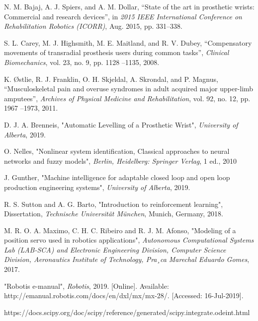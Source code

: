 \documentclass[letterpaper,12pt]{article}
\begin{document}
\begin{thebibliography}{99}
N. M. Bajaj, A. J. Spiers, and A. M. Dollar, “State of the art in prosthetic wrists: Commercial and research devices”, in \textit{2015 IEEE International Conference on Rehabilitation Robotics
(ICORR)}, Aug. 2015, pp. 331–338.

S. L. Carey, M. J. Highsmith, M. E. Maitland, and R. V. Dubey, “Compensatory movements
of transradial prosthesis users during common tasks”, \textit{Clinical Biomechanics}, vol. 23, no. 9,
pp. 1128 –1135, 2008.

K. Østlie, R. J. Franklin, O. H. Skjeldal, A. Skrondal, and P. Magnus, “Musculoskeletal pain
and overuse syndromes in adult acquired major upper-limb amputees”, \textit{Archives of Physical
Medicine and Rehabilitation}, vol. 92, no. 12, pp. 1967 –1973, 2011.

D. J. A. Brenneis, "Automatic Levelling of a Prosthetic Wrist", \textit{University of Alberta}, 2019.

O. Nelles, "Nonlinear system identification, Classical approaches to neural networks and fuzzy models", \textit{Berlin, Heidelberg: Springer Verlag}, 1 ed., 2010

J. Gunther, "Machine intelligence for adaptable closed loop and open loop production engineering systems", \textit{University of Alberta}, 2019.

R. S. Sutton and A. G. Barto, "Introduction to reinforcement learning", Dissertation, \textit{Technische Universität München}, Munich, Germany, 2018.

M. R. O. A. Maximo, C. H. C. Ribeiro and R. J. M. Afonso, "Modeling of a position servo used in robotics applications", \textit{Autonomous Computational Systems Lab (LAB-SCA) and Electronic Engineering Division, Computer Science Division, Aeronautics
Institute of Technology, Pra¸ca Marechal Eduardo Gomes}, 2017.

"Robotis e-manual", \textit{Robotis}, 2019. [Online]. Available: http://emanual.robotis.com/docs/en/dxl/mx/mx-28/. [Accessed: 16-Jul-2019].


https://docs.scipy.org/doc/scipy/reference/generated/scipy.integrate.odeint.html


\end{thebibliography}
\end{document}
